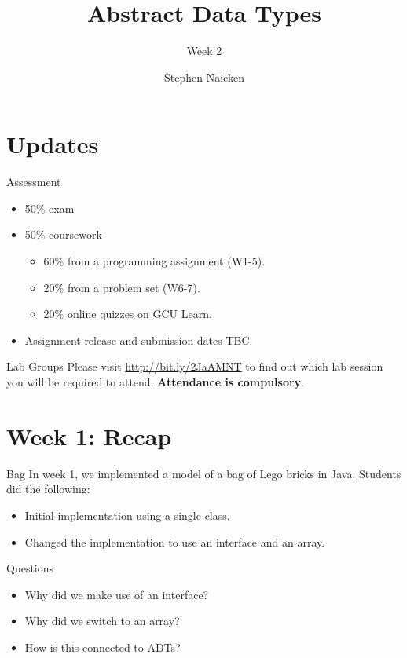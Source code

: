 \documentclass[pdf]{beamer}
\title{Abstract Data Types}
\subtitle{Week 2}
\author{Stephen Naicken}
\institute[ALU]{African Leadership University}
\begin{document}
\begin{frame}
    \titlepage
\end{frame}

\section{Updates}

\begin{frame}{Assessment}
    \begin{itemize}
        \item 50\% exam
        \item 50\% coursework
        \begin{itemize}
            \item 60\% from a programming assignment (W1-5).
            \item 20\% from a problem set (W6-7).
            \item 20\% online quizzes on GCU Learn.
        \end{itemize}
        \item Assignment release and submission dates TBC.
    \end{itemize}
\end{frame}

\begin{frame}{Lab Groups}
    Please visit \url{http://bit.ly/2JaAMNT} to find out which lab session you will be required to attend. \textbf{Attendance is compulsory}.
\end{frame}

\section{Week 1: Recap}

\begin{frame}{Bag}
        In week 1, we implemented a model of a bag of Lego bricks in Java.  Students did the following:
        
        \begin{itemize}
            \item Initial implementation using a single class.
            \item Changed the implementation to use an interface and an array.
        \end{itemize}
        
    
    \begin{block}{Questions}
        \begin{itemize}
            \item Why did we make use of an interface?
            \item Why did we switch to an array?
            \item How is this connected to ADTs?
        \end{itemize}
    \end{block}
\end{frame}
\end{document}
